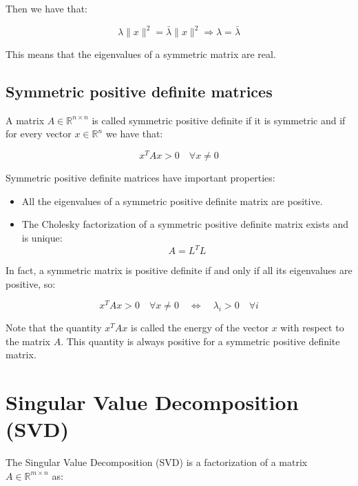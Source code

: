 Then we have that:

\begin{equation}
    \lambda \|x\|^2 = \bar{\lambda} \|x\|^2 \Rightarrow \lambda = \bar{\lambda}
\end{equation}

This means that the eigenvalues of a symmetric matrix are real.

\subsection{Symmetric positive definite matrices}

A matrix $A \in \mathbb{R}^{n \times n}$ is called symmetric positive definite if it is symmetric and if for every vector $x \in \mathbb{R}^n$
we have that:

\begin{equation}
    x^T A x > 0 \quad \forall x \neq 0
\end{equation}

Symmetric positive definite matrices have important properties:

\begin{itemize}
    \item All the eigenvalues of a symmetric positive definite matrix are positive.
    \item The Cholesky factorization of a symmetric positive definite matrix exists and is unique:
    \begin{equation}
        A = L^T L
    \end{equation}
\end{itemize}

In fact, a symmetric matrix is positive definite if and only if all its eigenvalues are positive, so:

\begin{equation}
    x^T A x > 0 \quad \forall x \neq 0 \quad \Leftrightarrow \quad \lambda_i > 0 \quad \forall i
\end{equation}

Note that the quantity $x^T A x$ is called the energy of the vector $x$ with respect to the matrix $A$. This quantity is always positive
for a symmetric positive definite matrix.\\


\section{Singular Value Decomposition (SVD)}

The Singular Value Decomposition (SVD) is a factorization of a matrix $A \in \mathbb{R}^{m \times n}$ as:

